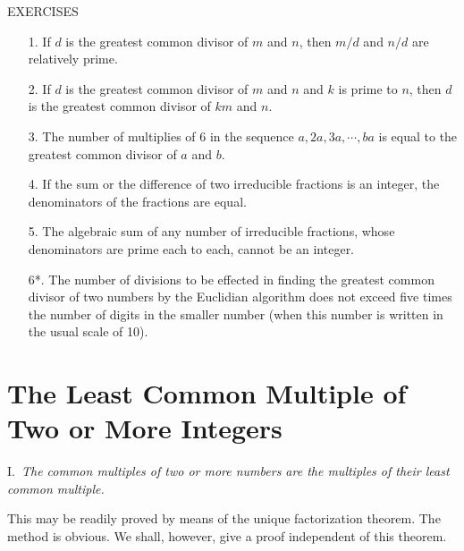 \documentclass[oneside]{book}
\begin{document}
\begin{center}
EXERCISES
\end{center}

\small \begin{enumerate}
\item[1.] If $d$ is the greatest common divisor of $m$ and $n$,
then $m / d$ and $n / d$ are relatively prime.

\item[2.] If $d$ is the greatest common divisor of $m$ and $n$ and
$k$ is prime to $n$, then $d$ is the greatest common divisor of $km$
and $n$.

\item[3.] The number of multiplies of $6$ in the sequence $a, 2a, 3a,
\cdots, ba$ is equal to the greatest common divisor of $a$ and $b$.

\item[4.] If the sum or the difference of two irreducible fractions is
an integer, the denominators of the fractions are equal.

\item[5.] The algebraic sum of any number of irreducible fractions,
whose denominators are prime each to each, cannot be an integer.

\item[6*.] The number of divisions to be effected in finding the
greatest common divisor of two numbers by the Euclidian algorithm
does not exceed five times the number of digits in the smaller
number (when this number is written in the usual scale of 10).
\end{enumerate}\normalsize%

\section{The Least Common Multiple of Two or More
Integers}\label{s10}%

I.~\emph{The common multiples of two or more numbers are the
multiples of their least common multiple.}

This may be readily proved by means of the unique factorization
theorem. The method is obvious. We shall, however, give a proof
independent of this theorem.
\end{document}
